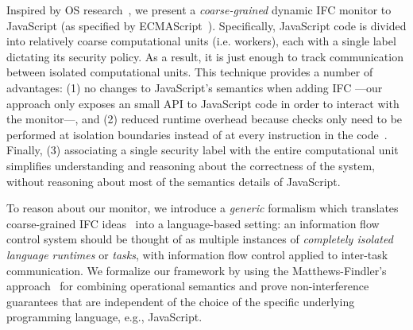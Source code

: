 Inspired by OS research~\cite{Zeldovich:2006}, we present a
\textit{coarse-grained} dynamic IFC monitor to JavaScript (as specified by
ECMAScript~\cite{ecma}). Specifically, JavaScript code is divided into relatively
coarse computational units (i.e. workers), each with a single label dictating
its security policy. As a result, it is just enough to track communication
between isolated computational units.
This technique provides a number of advantages: (1) no changes to JavaScript's
semantics when adding IFC ---our approach only exposes an small API to
JavaScript code in order to interact with the monitor---, and
(2) reduced runtime overhead because checks only need to be performed at isolation
boundaries instead of at every instruction in the code~\cite{JSFlow}.
Finally, (3) associating a single security label with the entire computational
unit simplifies understanding and reasoning about the correctness of the system,
without reasoning about most of the semantics details of JavaScript.

To reason about our monitor, we introduce a \emph{generic} formalism which
translates coarse-grained IFC ideas~\cite{Zeldovich:2006} into a language-based
setting: an information flow control system should be thought of as multiple
instances of \emph{completely isolated language runtimes} or \emph{tasks}, with
information flow control applied to inter-task communication.
We formalize our framework by using the Matthews-Findler's
approach~\cite{Matthews:2007:OSM:1190216.1190220} for combining operational
semantics and prove non-interference guarantees that are independent of the
choice of the specific underlying programming language, e.g., JavaScript.

